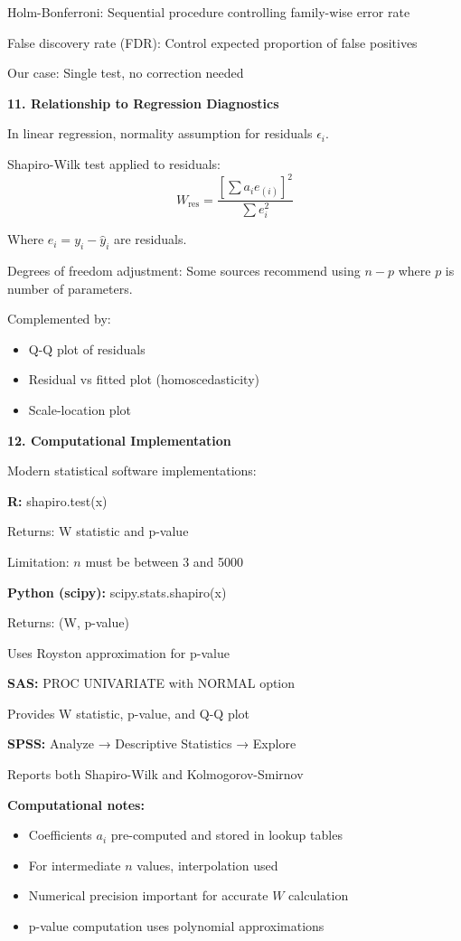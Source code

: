 \documentclass[12pt]{article}
\begin{document}
\begin{explanation}
Holm-Bonferroni: Sequential procedure controlling family-wise error rate

False discovery rate (FDR): Control expected proportion of false positives

Our case: Single test, no correction needed

\textbf{11. Relationship to Regression Diagnostics}

In linear regression, normality assumption for residuals $\epsilon_i$.

Shapiro-Wilk test applied to residuals:
\[W_{\text{res}} = \frac{[\sum a_i e_{(i)}]^2}{\sum e_i^2}\]

Where $e_i = y_i - \hat{y}_i$ are residuals.

Degrees of freedom adjustment: Some sources recommend using $n - p$ where $p$ is number of parameters.

Complemented by:
\begin{itemize}
\item Q-Q plot of residuals
\item Residual vs fitted plot (homoscedasticity)
\item Scale-location plot
\end{itemize}

\textbf{12. Computational Implementation}

Modern statistical software implementations:

\textbf{R:} shapiro.test(x)

Returns: W statistic and p-value

Limitation: $n$ must be between 3 and 5000

\textbf{Python (scipy):} scipy.stats.shapiro(x)

Returns: (W, p-value)

Uses Royston approximation for p-value

\textbf{SAS:} PROC UNIVARIATE with NORMAL option

Provides W statistic, p-value, and Q-Q plot

\textbf{SPSS:} Analyze → Descriptive Statistics → Explore

Reports both Shapiro-Wilk and Kolmogorov-Smirnov

\textbf{Computational notes:}
\begin{itemize}
\item Coefficients $a_i$ pre-computed and stored in lookup tables
\item For intermediate $n$ values, interpolation used
\item Numerical precision important for accurate $W$ calculation
\item p-value computation uses polynomial approximations
\end{itemize}

\end{explanation}
\end{document}
